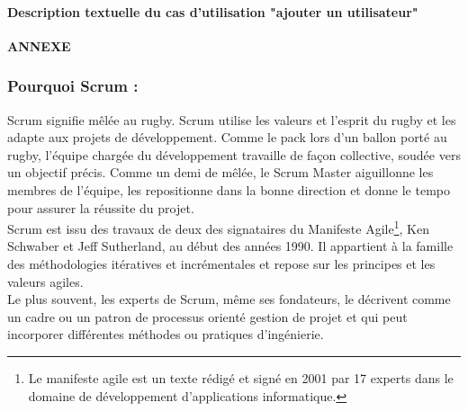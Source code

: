 \documentclass{article}
\begin{document}
\paragraph{Description textuelle du cas d'utilisation "ajouter un utilisateur"}

\begin{titlepage}\centering
\vspace*{\fill}
\textbf{\LARGE ANNEXE }
\vspace*{\fill}
\end{titlepage}
\setcounter{page}{41}
\appendix
\subsubsection*{Pourquoi Scrum :}
\vspace{0.5cm}
\vspace{0.3cm}

\guillemotleft Scrum signifie mêlée au rugby. Scrum utilise les valeurs et l’esprit du rugby et les adapte aux projets de développement. Comme le pack lors d’un ballon porté au rugby, l’équipe chargée du développement travaille de façon collective, soudée vers un objectif précis. Comme un demi de mêlée, le Scrum Master aiguillonne les membres de l’équipe, les repositionne dans la bonne direction et donne le tempo pour assurer la réussite du projet. \guillemotright [1]\\\label{sec:hello}
Scrum est issu des travaux de deux des signataires du Manifeste Agile\footnote{Le manifeste agile est un texte rédigé et signé en 2001 par 17 experts dans le domaine de développement d’applications informatique.}, Ken Schwaber et Jeff Sutherland, au début des années 1990. Il appartient à la famille des méthodologies itératives et incrémentales et repose sur les principes et les valeurs agiles.\\
Le plus souvent, les experts de Scrum, même ses fondateurs, le décrivent comme un cadre ou un patron de processus orienté gestion de projet et qui peut incorporer différentes méthodes ou pratiques d’ingénierie.
\end{document}
